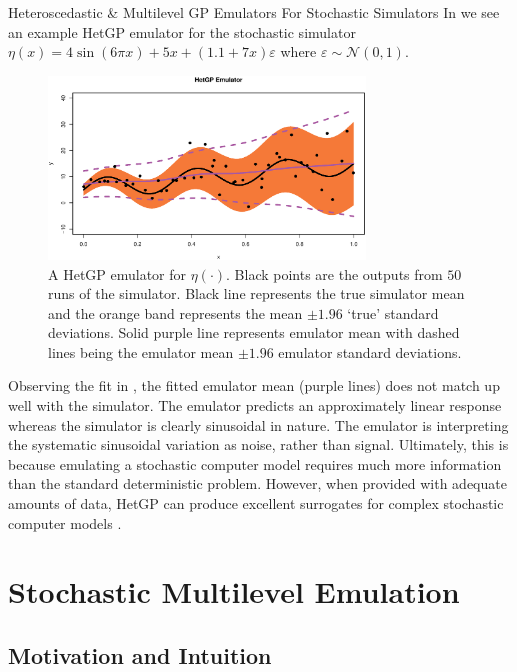 \begin{chapter}{Heteroscedastic \& Multilevel GP Emulators For Stochastic Simulators\label{Ch:Hetsml}}
In  we see an example HetGP emulator for the stochastic simulator $\eta(x) = 4\sin(6 \pi x) + 5x + (1.1+7x)\varepsilon$ where $\varepsilon \sim \mathcal{N}(0,1)$.
\begin{figure}[h]
	\centering
	\includegraphics[width=0.75\textwidth]{sml-het-fig/hetgp-example.eps}
	\caption{A HetGP emulator for $\eta(\cdot)$. Black points are the outputs from $50$ runs of the simulator. Black line represents the true simulator mean and the orange band represents the mean $\pm 1.96$ `true' standard deviations. Solid purple line represents emulator mean with dashed lines being the emulator mean $\pm 1.96$ emulator standard deviations.}
	\label{Fig:toy-HetGP}
\end{figure}
Observing the fit in , the fitted emulator mean (purple lines) does not match up well with the simulator. The emulator predicts an approximately linear response whereas the simulator is clearly sinusoidal in nature. The emulator is interpreting the systematic sinusoidal variation as noise, rather than signal. Ultimately, this is because emulating a stochastic computer model requires much more information than the standard deterministic problem. However, when provided with adequate amounts of data, HetGP can produce excellent surrogates for complex stochastic computer models \citep{Binois2018}.

\section{Stochastic Multilevel Emulation}

\subsection{Motivation and Intuition}



\end{chapter}

